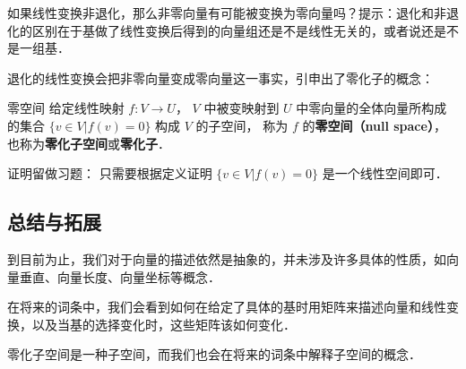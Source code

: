 \begin{exercise}{}
如果线性变换非退化，那么非零向量有可能被变换为零向量吗？提示：退化和非退化的区别在于基做了线性变换后得到的向量组还是不是线性无关的，或者说还是不是一组基．
\end{exercise}

退化的线性变换会把非零向量变成零向量这一事实，引申出了零化子的概念：

\begin{theorem}{零空间}\label{LinMap_the1}
给定线性映射 $f:V\to U$， $V$ 中被变映射到 $U$ 中零向量的全体向量所构成的集合 $\{{v}\in V|f(v)= 0\}$ 构成 $V$ 的子空间， 称为 $f$ 的\textbf{零空间（null space）}， 也称为\textbf{零化子空间}或\textbf{零化子}．
\end{theorem}
证明留做习题： 只需要根据定义证明 $\{{v}\in V|f(v)= 0\}$ 是一个线性空间即可． 

\subsection{总结与拓展}

到目前为止，我们对于向量的描述依然是抽象的，并未涉及许多具体的性质，如向量垂直、向量长度、向量坐标等概念．

在将来的词条中，我们会看到如何在给定了具体的基时用矩阵来描述向量和线性变换，以及当基的选择变化时，这些矩阵该如何变化．

零化子空间是一种子空间，而我们也会在将来的词条中解释子空间的概念．
